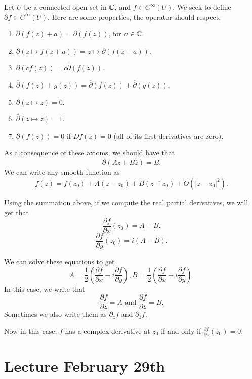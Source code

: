 \documentclass{article}
\begin{document}
{Let $U$ be a connected open set in $\mathbb{C}$, and $f \in C^\infty(U)$. We seek to define $\overline{\partial} f \in C^\infty(U)$. Here are some properties, the operator should respect,
\begin{enumerate}
    \item $\overline{\partial}(f(z) + a) = \overline{\partial}(f(z))$, for $a \in \mathbb{C}$.
    \item  $\overline{\partial}(z \mapsto f(z+a)) = z \mapsto \overline{\partial}(f(z + a))$.
    \item  $\overline{\partial}(cf(z)) = c\overline{\partial}(f(z))$.
    \item  $\overline{\partial}(f(z) + g(z)) = \overline{\partial}(f(z)) + \overline{\partial}(g(z))$.
    \item $\overline{\partial}(z \mapsto z) = 0$.
    \item $\overline{\partial}(z \mapsto \overline{z}) = 1$.
    \item $\overline{\partial}(f(z)) = 0$ if $Df(z) = 0$ (all of its first derivatives are zero).
\end{enumerate}

As a consequence of these axioms, we should have that
\[\overline{\partial}(Az + B \overline{z}) = B.\]
We can write any smooth function as
\[f(z) = f(z_0) + A (z - z_0) + B(\overline{z - z_0}) + O(|z - z_0|^2).\]

Using the summation above, if we compute the real partial derivatives, we will get that 
\[\frac{\partial f}{\partial x}(z_0) = A + B.\]
\[\frac{\partial f}{\partial y}(z_0) = i (A - B).\]

We can solve these equations to get
\[A = \frac{1}{2}(\frac{\partial f}{\partial x} - i \frac{\partial f}{\partial y}), B = \frac{1}{2} (\frac{\partial f}{\partial x} + i \frac{\partial f}{\partial y}).\]
In this case, we write that
\[\frac{\partial f}{\partial z} = A \text{ and } \frac{\partial f}{\partial \overline{z}} = B.\]
Sometimes we also write them as $\partial_z f$ and $\partial_{\overline{z}} f$.

Now in this case, $f$ has a complex derivative at $z_0$ if and only if $\frac{\partial f}{\partial \overline{z}}(z_0) = 0$. 

\newpage
\section{Lecture February 29th}

}
\end{document}

